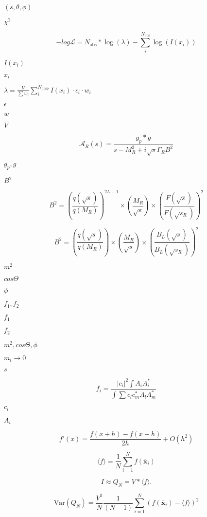 \documentclass{article}
\begin{document}
$(s,\theta,\phi)$
\pagebreak

$\chi^{2}$
\pagebreak

\[ -log \mathcal{L} = N_{\mathrm{obs}} * \log(\lambda) - \sum_i^{N_{\mathrm{obs}}} \log(I(x_i)) \]
\pagebreak

$I(x_i)$
\pagebreak

$x_i$
\pagebreak

$ \lambda = \frac{V}{\sum w_i}\sum_i^{N_{\mathrm{phsp}}} I(x_i)\cdot \epsilon_i \cdot w_i $
\pagebreak

$ \epsilon $
\pagebreak

$ w $
\pagebreak

$ V $
\pagebreak

\[ \mathcal{A}_R(s) = \frac{g_p*g}{s - M_R^2 + i \sqrt{s} \Gamma_R B^2} \]
\pagebreak

$ g_p, g$
\pagebreak

$ B^2$
\pagebreak

\[ B^2 = \left( \frac{q(\sqrt{s})}{q(M_R)} \right)^{2L+1} \times \left( \frac{M_R}{\sqrt{s}} \right) \times \left( \frac{F(\sqrt{s})}{F(\sqrt{s_R})} \right)^{2} \]
\pagebreak

\[ B^2 = \left( \frac{q(\sqrt{s})}{q(M_R)} \right) \times \left( \frac{M_R}{\sqrt{s}} \right) \times \left( \frac{B_L(\sqrt{s})}{B_L(\sqrt{s_R})} \right)^{2} \]
\pagebreak

$m^2$
\pagebreak

$cos\Theta$
\pagebreak

$\phi$
\pagebreak

$f_1,f_2$
\pagebreak

$f_1$
\pagebreak

$f_2$
\pagebreak

$m^2, cos\Theta, \phi$
\pagebreak

$m_i\rightarrow 0$
\pagebreak

$s$
\pagebreak

\[ f_i = \frac{|c_i|^2 \int A_i A_i^*}{\int \sum c_l c_m^* A_l A_m^*} \]
\pagebreak

$c_i$
\pagebreak

$A_i$
\pagebreak

\[ f'(x) = \frac{f(x+h) - f(x-h)}{2h} + O(h^2) \]
\pagebreak

\[ \langle f \rangle =\frac{1}{N} \sum_{i=1}^N f(\overline{\mathbf{x}}_i) \]
\pagebreak

\[ I \approx Q_N = V*\langle f \rangle. \]
\pagebreak

\[ \mathrm{Var}(Q_N) = \frac{V^2}{N} \frac{1}{(N-1)} \sum_{i=1}^N \left (f(\overline{\mathbf{x}}_i) - \langle f \rangle \right )^2 \]
\pagebreak
\end{document}
